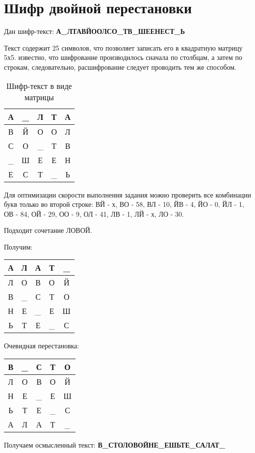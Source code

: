 \section{Шифр двойной перестановки}

Дан шифр-текст: \textbf{А\_ЛТАВЙООЛСО\_ТВ\_ШЕЕНЕСТ\_Ь}

Текст содержит 25 символов, что позволяет записать его в квадратную матрицу 5х5. известно, что шифрование производилось сначала по столбцам, а затем по строкам, следовательно, расшифрование следует проводить тем же способом.

\begin{table}[H]
	\centering
	\begin{tabular}{|c|c|c|c|c|}
		\hline
		А  & \_ & Л  & Т  & А \\ \hline
		В  & Й  & О  & О  & Л \\ \hline
		С  & О  & \_ & Т  & В \\ \hline
		\_ & Ш  & Е  & Е  & Н \\ \hline
		Е  & С  & Т  & \_ & Ь \\ \hline
	\end{tabular}
	\caption{Шифр-текст в виде матрицы}
\end{table}

Для оптимизации скорости выполнения задания можно проверить все комбинации букв только во второй строке: ВЙ - х, ВО - 58, ВЛ - 10, ЙВ - 4, ЙО - 0, ЙЛ - 1, ОВ - 84, ОЙ - 29, ОО - 9, ОЛ - 41, ЛВ - 1, ЛЙ - х, ЛО - 30.	

Подходит сочетание ЛОВОЙ.

Получим:

\begin{table}[H]
	\centering
	\begin{tabular}{|c|c|c|c|c|}
		\hline
		А & Л  & А  & Т  & \_ \\ \hline
		Л & О  & В  & О  & Й  \\ \hline
		В & \_ & С  & Т  & О  \\ \hline
		Н & Е  & \_ & Е  & Ш  \\ \hline
		Ь & Т  & Е  & \_ & С  \\ \hline
	\end{tabular}
\end{table}

Очевидная перестановка:
\begin{table}[H]
	\centering
	\begin{tabular}{|c|c|c|c|c|}
		\hline
		В & \_ & С  & Т  & О  \\ \hline
		Л & О  & В  & О  & Й  \\ \hline
		Н & Е  & \_ & Е  & Ш  \\ \hline
		Ь & Т  & Е  & \_ & С  \\ \hline
		А & Л  & А  & Т  & \_ \\ \hline
	\end{tabular}
\end{table}


Получаем осмысленный текст: \textbf{В\_СТОЛОВОЙНЕ\_ЕШЬТЕ\_САЛАТ\_}
